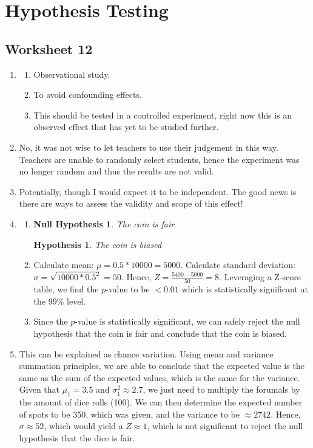\documentclass[12pt]{article}
\theoremstyle{plain}
\newtheorem{hypothesis}{Hypothesis}
\newtheorem{nullhypothesis}{Null Hypothesis}
\theoremstyle{definition}
\numberwithin{equation}{theorem}
\begin{document}
\section{Hypothesis Testing}
\subsection{Worksheet 12}
\begin{enumerate}
\addtocounter{enumi}{1}
\item
	\begin{enumerate}
	\item Observational study.
	\item To avoid confounding effects.
	\item This should be tested in a controlled experiment, right now this is an observed effect that has yet to be studied further.
	\end{enumerate}
\addtocounter{enumi}{1}
\item No, it was not wise to let teachers to use their judgement in this way. Teachers are unable to randomly select students, hence the experiment was no longer random and thus the results are not valid.
\item Potentially, though I would expect it to be independent. The good news is there are ways to assess the validity and scope of this effect!
\item
	\begin{enumerate}
	\item
	\begin{nullhypothesis}The coin is fair\end{nullhypothesis}
	\begin{hypothesis}The coin is biased \end{hypothesis}
	\item Calculate mean: $\mu = 0.5*10000 = 5000$. Calculate standard deviation: $\sigma = \sqrt{10000*0.5^{2}} = 50$. Hence, $Z = \frac{5400-5000}{50} = 8$. Leveraging a Z-score table, we find the $p$-value to be $< 0.01$ which is statistically significant at the 99\% level.
	\item Since the $p$-value is statistically significant, we can safely reject the null hypothesis that the coin is fair and conclude that the coin is biased.
	\end{enumerate}
\item 	This can be explained as chance variation. Using mean and variance summation principles, we are able to conclude that the expected value is the same as the sum of the expected values, which is the same for the variance. Given that $\mu_{1} = 3.5$ and $\sigma_{1}^{2} \approx 2.7$, we just need to multiply the forumals by the amount of dice rolls (100). We can then determine the expected number of spots to be 350, which was given, and the variance to be $\approx 2742$. Hence, $\sigma \approx 52$, which would yield a $Z \approx 1$, which is not significant to reject the null hypothesis that the dice is fair.

\end{enumerate}
\end{document}

